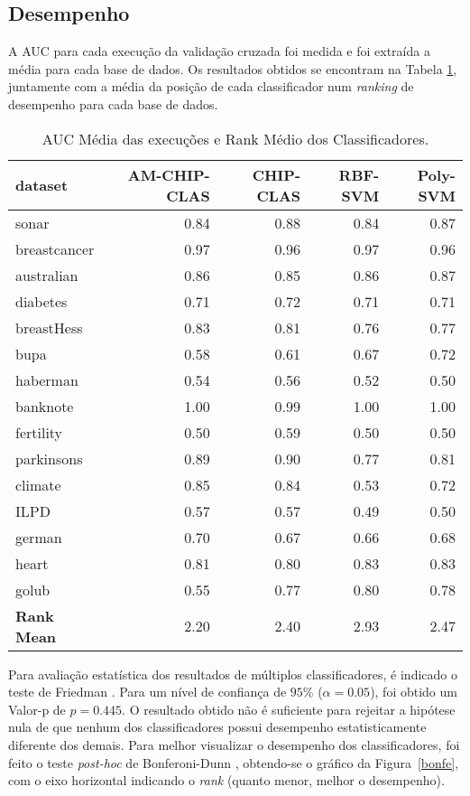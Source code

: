 \documentclass[
	12pt,				%
	openright,			%
	twoside,			%
	a4paper,			%
	english,			%
	spanish,			%
	brazil,				%
	]{abntex2}\usepackage[]{graphicx}\usepackage[]{color}
\begin{document}
\subsection{Desempenho}

A AUC para cada execução da validação cruzada foi medida e foi extraída a média para cada base de dados. Os resultados obtidos se encontram na Tabela \ref{tabauc}, juntamente com a média da posição de cada classificador num \textit{ranking} de desempenho para cada base de dados.

\begin{table}[ht]
\centering
\caption{AUC Média das execuções e Rank Médio dos Classificadores.} 
\label{tabauc}
\begin{tabular}{lrrrr}
  \hline
dataset & AM-CHIP-CLAS & CHIP-CLAS & RBF-SVM & Poly-SVM \\ 
  \hline
sonar & 0.84 & 0.88 & 0.84 & 0.87 \\ 
  breastcancer & 0.97 & 0.96 & 0.97 & 0.96 \\ 
  australian & 0.86 & 0.85 & 0.86 & 0.87 \\ 
  diabetes & 0.71 & 0.72 & 0.71 & 0.71 \\ 
  breastHess & 0.83 & 0.81 & 0.76 & 0.77 \\ 
  bupa & 0.58 & 0.61 & 0.67 & 0.72 \\ 
  haberman & 0.54 & 0.56 & 0.52 & 0.50 \\ 
  banknote & 1.00 & 0.99 & 1.00 & 1.00 \\ 
  fertility & 0.50 & 0.59 & 0.50 & 0.50 \\ 
  parkinsons & 0.89 & 0.90 & 0.77 & 0.81 \\ 
  climate & 0.85 & 0.84 & 0.53 & 0.72 \\ 
  ILPD & 0.57 & 0.57 & 0.49 & 0.50 \\ 
  german & 0.70 & 0.67 & 0.66 & 0.68 \\ 
  heart & 0.81 & 0.80 & 0.83 & 0.83 \\ 
  golub & 0.55 & 0.77 & 0.80 & 0.78 \\ 
   \hline
\textbf{Rank Mean} & 2.20 & 2.40 & 2.93 & 2.47 \\ 
   \hline
\end{tabular}
\end{table}
\par Para avaliação estatística dos resultados de múltiplos classificadores, é indicado o teste de Friedman \cite{Demsar2006}. Para um nível de confiança de $95\%$ ($\alpha = 0.05$), foi obtido um Valor-p de $p = 0.445$. O resultado obtido não é suficiente para rejeitar a hipótese nula de que nenhum dos classificadores possui desempenho estatisticamente diferente dos demais. Para melhor visualizar o desempenho dos classificadores, foi feito o teste \textit{post-hoc} de Bonferoni-Dunn \cite{Demsar2006}, obtendo-se o gráfico da Figura~\ref{bonfe}, com o eixo horizontal indicando o \textit{rank} (quanto menor, melhor o desempenho).
\end{document}
